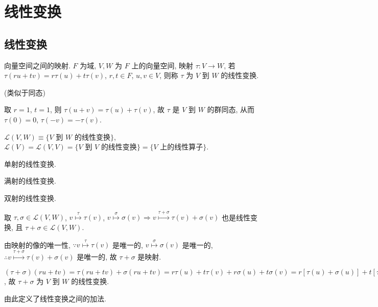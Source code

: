 \documentclass{note}
\begin{document}
\chapter{线性变换}
\section{线性变换}
\begin{df}[线性变换]
    向量空间之间的映射. $F$ 为域, $V,W$ 为 $F$ 上的向量空间, 映射 $\tau:V\rightarrow W$, 若 $\tau(ru+tv)=r\tau(u)+t\tau(v)$, $r,t\in F$, $u,v\in V$, 则称 $\tau$ 为 $V$ 到 $W$ 的线性变换.
\end{df}
(类似于同态)

取 $r=1$, $t=1$, 则 $\tau(u+v)=\tau(u)+\tau(v)$, 故 $\tau$ 是 $V$ 到 $W$ 的群同态, 从而 $\tau(0)=0$, $\tau(-v)=-\tau(v)$.

$\mathcal{L}(V,W)\equiv\{\text{$V$ 到 $W$ 的线性变换}\}$, $\mathcal{L}(V)=\mathcal{L}(V,V)=\{\text{$V$ 到 $V$ 的线性变换}\}=\{\text{$V$ 上的线性算子}\}$.

\begin{df}[单线性变换]
    单射的线性变换.
\end{df}

\begin{df}[满线性变换]
    满射的线性变换.
\end{df}

\begin{df}[同构]
    双射的线性变换.
\end{df}

取 $\tau,\sigma\in\mathcal{L}(V,W)$, $v\overset{\tau}{\mapsto}\tau(v)$, $v\overset{\sigma}{\mapsto}\sigma(v)\Longrightarrow v\overset{\tau+\sigma}{\mapsto}\tau(v)+\sigma(v)$ 也是线性变换, 且 $\tau+\sigma\in\mathcal{L}(V,W)$.
\begin{pf}
    由映射的像的唯一性, $\because v\overset{\tau}{\mapsto}\tau(v)$ 是唯一的, $v\overset{\sigma}{\mapsto}\sigma(v)$ 是唯一的, $\therefore v\overset{\tau+\sigma}{\mapsto}\tau(v)+\sigma(v)$ 是唯一的, 故 $\tau+\sigma$ 是映射.

    $(\tau+\sigma)(ru+tv)=\tau(ru+tv)+\sigma(ru+tv)=r\tau(u)+t\tau(v)+r\sigma(u)+t\sigma(v)=r[\tau(u)+\sigma(u)]+t[\tau(v)+\sigma(v)]=r[(\tau+\sigma)(u)]+t[(\tau+\sigma)(v)]$, 故 $\tau+\sigma$ 为 $V$ 到 $W$ 的线性变换.
\end{pf}
由此定义了线性变换之间的加法.
\end{document}
